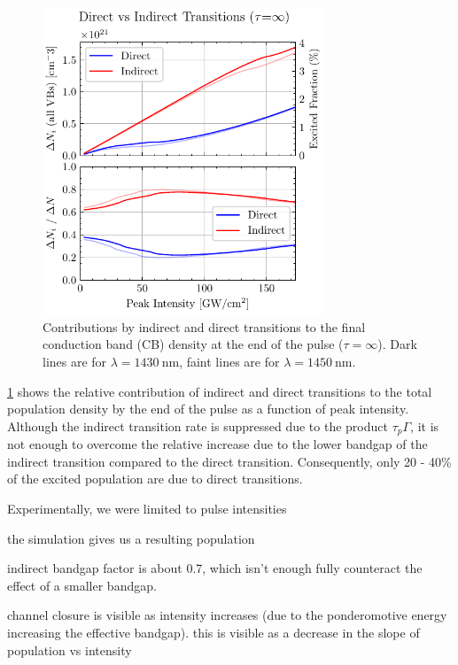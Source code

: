 \begin{figure}
	\centering
	\includegraphics[width=0.75\textwidth]{figures/chap4/Direct_vs_Indirect_Trans.pdf}
	\caption{Contributions by indirect and direct transitions to the final conduction band (CB) density at the end of the pulse ($\tau = \infty$). Dark lines are for $\lambda = 1430 \ \textrm{nm}$, faint lines are for $\lambda = 1450 \ \textrm{nm}$.}
	\label{fig:Direct_vs_Indirect_Trans}
\end{figure}

\cref{fig:Direct_vs_Indirect_Trans} shows the relative contribution of indirect and direct transitions to the total population density by the end of the pulse as a function of peak intensity. Although the indirect transition rate is suppressed due to the product $\tau_p \Gamma$, it is not enough to overcome the relative increase due to the lower bandgap of the indirect transition compared to the direct transition. Consequently, only 20 - 40\% of the excited population are due to direct transitions.

Experimentally, we were limited to pulse intensities


the simulation gives us a resulting population

indirect bandgap factor is about 0.7, which isn't enough fully counteract the effect of a smaller bandgap.

channel closure is visible as intensity increases (due to the ponderomotive energy increasing the effective bandgap). this is visible as a decrease in the slope of population vs intensity


